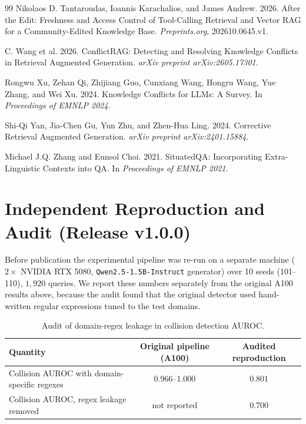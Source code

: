\documentclass[11pt,a4paper]{article}
\theoremstyle{definition}
\begin{document}
\begin{thebibliography}{99}
Nikolaos D. Tantaroudas, Ioannis Karachalios, and James Andrew. 2026.
After the Edit: Freshness and Access Control of Tool-Calling Retrieval and Vector RAG for a Community-Edited Knowledge Base.
\emph{Preprints.org}, 202610.0645.v1.

C. Wang et al. 2026.
ConflictRAG: Detecting and Resolving Knowledge Conflicts in Retrieval Augmented Generation.
\emph{arXiv preprint arXiv:2605.17301}.

Rongwu Xu, Zehan Qi, Zhijiang Guo, Cunxiang Wang, Hongru Wang, Yue Zhang, and Wei Xu. 2024.
Knowledge Conflicts for LLMs: A Survey.
In \emph{Proceedings of EMNLP 2024}.

Shi-Qi Yan, Jia-Chen Gu, Yun Zhu, and Zhen-Hua Ling. 2024.
Corrective Retrieval Augmented Generation.
\emph{arXiv preprint arXiv:2401.15884}.

Michael J.Q. Zhang and Eunsol Choi. 2021.
SituatedQA: Incorporating Extra-Linguistic Contexts into QA.
In \emph{Proceedings of EMNLP 2021}.

\end{thebibliography}

\appendix
\section{Independent Reproduction and Audit (Release v1.0.0)}
Before publication the experimental pipeline was re-run on a separate machine ($2\times$ NVIDIA RTX 5080, \texttt{Qwen2.5-1.5B-Instruct} generator) over 10 seeds (101--110), $1{,}920$ queries. We report these numbers separately from the original A100 results above, because the audit found that the original detector used hand-written regular expressions tuned to the test domains.

\begin{table}[h]
\centering
\begin{tabular}{lcc}
\toprule
\textbf{Quantity} & \textbf{Original pipeline (A100)} & \textbf{Audited reproduction} \\
\midrule
Collision AUROC with domain-specific regexes & 0.966--1.000 & 0.801 \\
Collision AUROC, regex leakage removed & not reported & 0.700 \\
\bottomrule
\end{tabular}
\caption{Audit of domain-regex leakage in collision detection AUROC.}
\label{tab:audit_auroc}
\end{table}
\end{document}
